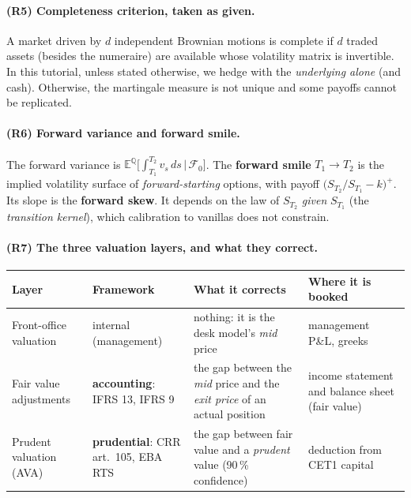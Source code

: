 \documentclass[11pt,a4paper]{article}
\newcommand{\E}{\mathbb{E}^{\mathbb{Q}}}
\begin{document}
\paragraph{(R5) Completeness criterion, taken as given.} A market driven by $d$ independent Brownian
motions is complete if $d$ traded assets (besides the numeraire) are available whose volatility matrix is
invertible. In this tutorial, unless stated otherwise, we hedge with the \emph{underlying alone} (and cash).
Otherwise, the martingale measure is not unique and some payoffs cannot be replicated.

\paragraph{(R6) Forward variance and forward smile.} The forward variance is $\E\big[\int_{T_1}^{T_2} v_s\,ds \,\big|\, \mathcal{F}_0\big]$. The
\textbf{forward smile} $T_1 \to T_2$ is the implied volatility surface of \emph{forward-starting} options, with payoff
$\big(S_{T_2}/S_{T_1} - k\big)^+$. Its slope is the \textbf{forward skew}. It depends on the law of $S_{T_2}$ \emph{given} $S_{T_1}$ (the \emph{transition
kernel}), which calibration to vanillas does not constrain.

\paragraph{(R7) The three valuation layers, and what they correct.}

\begin{center}
\small
\begin{tabularx}{\textwidth}{@{}>{\raggedright\arraybackslash}X >{\raggedright\arraybackslash}X >{\raggedright\arraybackslash}X >{\raggedright\arraybackslash}X@{}}
\toprule
\textbf{Layer} & \textbf{Framework} & \textbf{What it corrects} & \textbf{Where it is booked} \\
\midrule
Front-office valuation & internal (management) & nothing: it is the desk model's \emph{mid} price & management P\&L, greeks \\[0.3em]
Fair value adjustments & \textbf{accounting}: IFRS 13, IFRS 9 & the gap between the \emph{mid} price and the \emph{exit price} of an actual position & income statement and balance sheet (fair value) \\[0.3em]
Prudent valuation (AVA) & \textbf{prudential}: CRR art.\ 105, EBA RTS & the gap between fair value and a \emph{prudent} value (90\,\% confidence) & deduction from CET1 capital \\
\bottomrule
\end{tabularx}
\end{center}
\end{document}
